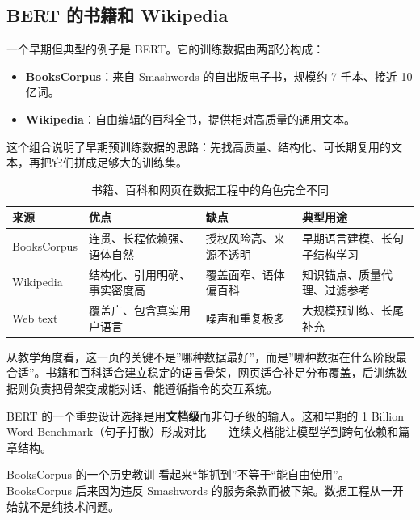 \subsection{BERT 的书籍和 Wikipedia}

一个早期但典型的例子是 BERT。它的训练数据由两部分构成：
\begin{itemize}
    \item \textbf{BooksCorpus}：来自 Smashwords 的自出版电子书，规模约 7 千本、接近 10 亿词。
    \item \textbf{Wikipedia}：自由编辑的百科全书，提供相对高质量的通用文本。
\end{itemize}

这个组合说明了早期预训练数据的思路：先找高质量、结构化、可长期复用的文本，再把它们拼成足够大的训练集。

\begin{table}[H]
\centering
\begin{tabular}{p{}p{}p{}p{}}
\toprule
\textbf{来源} & \textbf{优点} & \textbf{缺点} & \textbf{典型用途} \\
\midrule
BooksCorpus & 连贯、长程依赖强、语体自然 & 授权风险高、来源不透明 & 早期语言建模、长句子结构学习 \\
Wikipedia & 结构化、引用明确、事实密度高 & 覆盖面窄、语体偏百科 & 知识锚点、质量代理、过滤参考 \\
Web text & 覆盖广、包含真实用户语言 & 噪声和重复极多 & 大规模预训练、长尾补充 \\
\bottomrule
\end{tabular}
\caption{书籍、百科和网页在数据工程中的角色完全不同}
\end{table}

从教学角度看，这一页的关键不是”哪种数据最好”，而是”哪种数据在什么阶段最合适”。书籍和百科适合建立稳定的语言骨架，网页适合补足分布覆盖，后训练数据则负责把骨架变成能对话、能遵循指令的交互系统。

BERT 的一个重要设计选择是用\textbf{文档级}而非句子级的输入。这和早期的 1 Billion Word Benchmark（句子打散）形成对比——连续文档能让模型学到跨句依赖和篇章结构。

\begin{warningbox}{BooksCorpus 的一个历史教训}
看起来“能抓到”不等于“能自由使用”。BooksCorpus 后来因为违反 Smashwords 的服务条款而被下架。数据工程从一开始就不是纯技术问题。
\end{warningbox}


